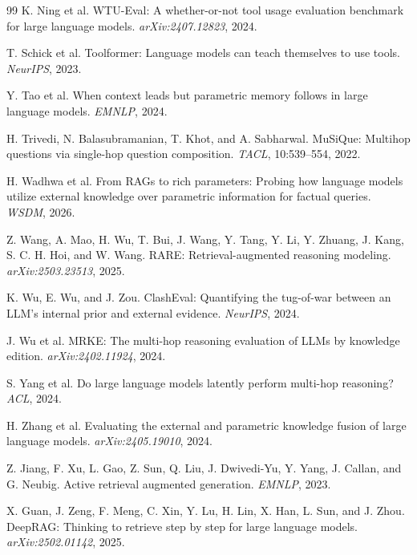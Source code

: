 \documentclass[10pt,letterpaper]{article}
\begin{document}
\begin{thebibliography}{99}
K. Ning et al.
{WTU-Eval}: A whether-or-not tool usage evaluation benchmark for large language models.
\emph{arXiv:2407.12823}, 2024.

T. Schick et al.
Toolformer: Language models can teach themselves to use tools.
\emph{NeurIPS}, 2023.

Y. Tao et al.
When context leads but parametric memory follows in large language models.
\emph{EMNLP}, 2024.

H. Trivedi, N. Balasubramanian, T. Khot, and A. Sabharwal.
{MuSiQue}: Multihop questions via single-hop question composition.
\emph{TACL}, 10:539--554, 2022.

H. Wadhwa et al.
From {RAGs} to rich parameters: Probing how language models utilize external knowledge over parametric information for factual queries.
\emph{WSDM}, 2026.

Z. Wang, A. Mao, H. Wu, T. Bui, J. Wang, Y. Tang, Y. Li, Y. Zhuang, J. Kang, S. C. H. Hoi, and W. Wang.
{RARE}: Retrieval-augmented reasoning modeling.
\emph{arXiv:2503.23513}, 2025.

K. Wu, E. Wu, and J. Zou.
{ClashEval}: Quantifying the tug-of-war between an {LLM}'s internal prior and external evidence.
\emph{NeurIPS}, 2024.

J. Wu et al.
{MRKE}: The multi-hop reasoning evaluation of {LLMs} by knowledge edition.
\emph{arXiv:2402.11924}, 2024.

S. Yang et al.
Do large language models latently perform multi-hop reasoning?
\emph{ACL}, 2024.

H. Zhang et al.
Evaluating the external and parametric knowledge fusion of large language models.
\emph{arXiv:2405.19010}, 2024.

Z. Jiang, F. Xu, L. Gao, Z. Sun, Q. Liu, J. Dwivedi-Yu, Y. Yang, J. Callan, and G. Neubig.
Active retrieval augmented generation.
\emph{EMNLP}, 2023.

X. Guan, J. Zeng, F. Meng, C. Xin, Y. Lu, H. Lin, X. Han, L. Sun, and J. Zhou.
{DeepRAG}: Thinking to retrieve step by step for large language models.
\emph{arXiv:2502.01142}, 2025.


\end{thebibliography}
\end{document}
